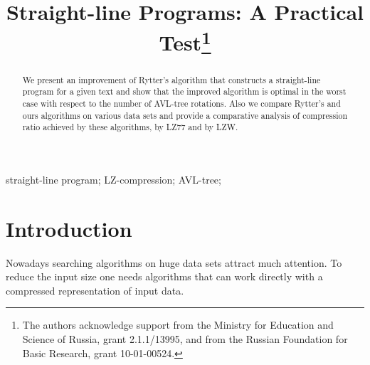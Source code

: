 ﻿\documentclass[10pt, conference, compsocconf]{IEEEtran}
\begin{document}
\title{Straight-line Programs: A Practical Test\thanks{The authors acknowledge support
from the Ministry for Education and Science of Russia, grant 2.1.1/13995, and
from the Russian Foundation for Basic Research, grant 10-01-00524.}}

\author{
\and
{}
}

\maketitle

\begin{abstract}
We present an improvement of Rytter's algorithm that constructs a straight-line program for a given text and show that
the improved algorithm is optimal in the worst case with respect to the number of AVL-tree rotations. Also we compare
Rytter's and ours algorithms on various data sets and provide a comparative analysis of compression ratio achieved by
these algorithms, by LZ77 and by LZW.
\end{abstract}

\begin{IEEEkeywords}
straight-line program; LZ-compression; AVL-tree;
\end{IEEEkeywords}

\IEEEpeerreviewmaketitle

\section{Introduction}

Nowadays searching algorithms on huge data sets attract much attention. To reduce the input size one needs algorithms
that can work directly with a compressed representation of input data.
\end{document}
